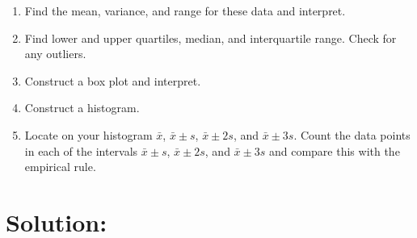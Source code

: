 \documentclass{article}
\begin{document}
\begin{enumerate}
    \item[(a)] Find the mean, variance, and range for these data and interpret.
    
    \item[(b)] Find lower and upper quartiles, median, and interquartile range. Check for any outliers.
    
    \item[(c)] Construct a box plot and interpret.
    
    \item[(d)] Construct a histogram.
    
    \item[(e)] Locate on your histogram $\bar{x}$, $\bar{x} \pm s$, $\bar{x} \pm 2s$, and $\bar{x} \pm 3s$. Count the data points in each of the intervals $\bar{x} \pm s$, $\bar{x} \pm 2s$, and $\bar{x} \pm 3s$ and compare this with the empirical rule.
    
\end{enumerate}

\section*{Solution:}
\end{document}
